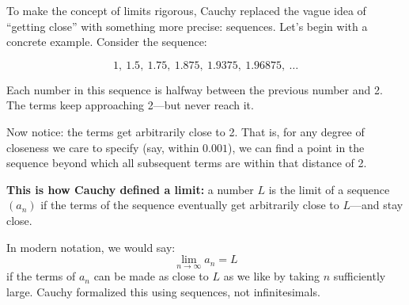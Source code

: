 To make the concept of limits rigorous, Cauchy replaced the vague idea of “getting close” with something more precise: sequences.  Let’s begin with a concrete example. Consider the sequence:

\[
1,\ 1.5,\ 1.75,\ 1.875,\ 1.9375,\ 1.96875,\ \dots
\]

Each number in this sequence is halfway between the previous number and 2. The terms keep approaching 2—but never reach it.

Now notice: the terms get arbitrarily close to 2. That is, for any degree of closeness we care to specify (say, within \(0.001\)), we can find a point in the sequence beyond which all subsequent terms are within that distance of 2.

\textbf{This is how Cauchy defined a limit:} a number \( L \) is the limit of a sequence \( (a_n) \) if the terms of the sequence eventually get arbitrarily close to \( L \)—and stay close.

In modern notation, we would say:  
\[
\lim_{n \to \infty} a_n = L
\]
if the terms of \( a_n \) can be made as close to \( L \) as we like by taking \( n \) sufficiently large. Cauchy formalized this using sequences, not infinitesimals.

\begin{center}
\end{center}



